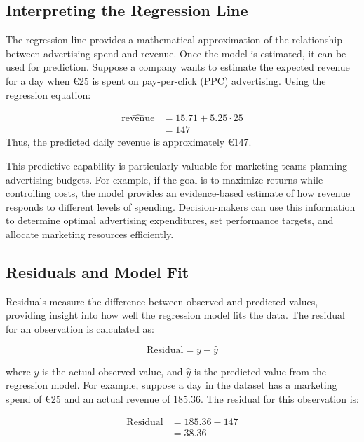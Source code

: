 \documentclass[
  11pt,
]{book}
\theoremstyle{definition}
\theoremstyle{definition}
\theoremstyle{definition}
\theoremstyle{definition}
\theoremstyle{remark}
\begin{document}
\subsection*{Interpreting the Regression Line}\label{interpreting-the-regression-line}


The regression line provides a mathematical approximation of the relationship between advertising spend and revenue. Once the model is estimated, it can be used for prediction. Suppose a company wants to estimate the expected revenue for a day when €25 is spent on pay-per-click (PPC) advertising. Using the regression equation:

\begin{equation} 
\begin{split}
\hat{\text{revenue}} & = 15.71 + 5.25 \cdot 25 \\
 & = 147
\end{split}
\end{equation}
Thus, the predicted daily revenue is approximately €147.

This predictive capability is particularly valuable for marketing teams planning advertising budgets. For example, if the goal is to maximize returns while controlling costs, the model provides an evidence-based estimate of how revenue responds to different levels of spending. Decision-makers can use this information to determine optimal advertising expenditures, set performance targets, and allocate marketing resources efficiently.

\subsection*{Residuals and Model Fit}\label{residuals-and-model-fit}


Residuals measure the difference between observed and predicted values, providing insight into how well the regression model fits the data. The residual for an observation is calculated as:

\[
\text{Residual} = y - \hat{y}
\]

where \(y\) is the actual observed value, and \(\hat{y}\) is the predicted value from the regression model. For example, suppose a day in the dataset has a marketing spend of €25 and an actual revenue of 185.36. The residual for this observation is:

\begin{equation} 
\begin{split}
\text{Residual} & = 185.36 - 147 \\
 & = 38.36
\end{split}
\end{equation}
\end{document}
